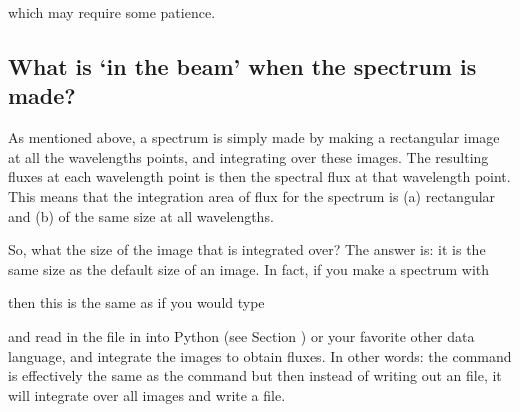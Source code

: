 \documentclass[letterpaper,10pt,english]{sphinxmanual}
\begin{document}
\begin{sphinxVerbatim}[commandchars=\\\{\}]
       
\end{sphinxVerbatim}

which may require some patience.


\subsection{What is ‘in the beam’ when the spectrum is made?}
\label{\detokenize{imagesspectra:what-is-in-the-beam-when-the-spectrum-is-made}}
As mentioned above, a spectrum is simply made by making a rectangular image at
all the wavelengths points, and integrating over these images. The resulting
fluxes at each wavelength point is then the spectral flux at that wavelength
point. This means that the integration area of flux for the spectrum is (a)
rectangular and (b) of the same size at all wavelengths.

So, what  the size of the image that is integrated over? The answer is: it
is the same size as the default size of an image. In fact, if you make a
spectrum with

\begin{sphinxVerbatim}[commandchars=\\\{\}]
          
\end{sphinxVerbatim}

then this is the same as if you would type

\begin{sphinxVerbatim}[commandchars=\\\{\}]
          
\end{sphinxVerbatim}

and read in the file  in into Python (see Section
{\hyperref[\detokenize{imagesspectra:sec-multi-wavelength-images}]{}}) or your favorite other data language, and
integrate the images to obtain fluxes. In other words: the command 
is effectively the same as the command  but then instead of writing out
an  file, it will integrate over all images and write a
 file.
\end{document}
